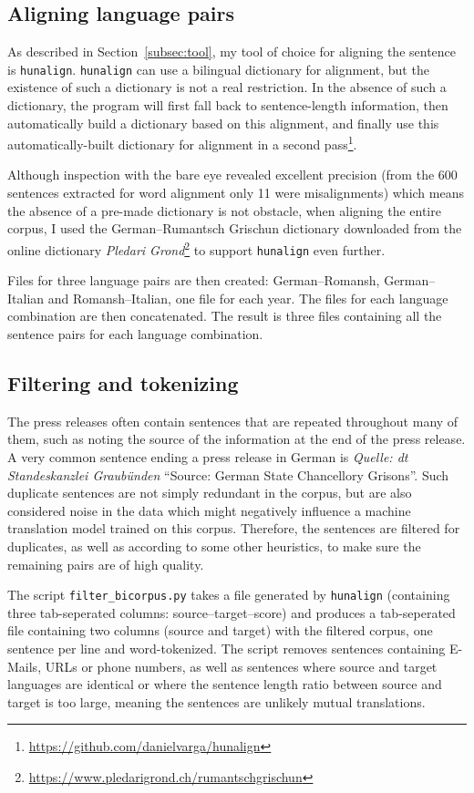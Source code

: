 \subsection{Aligning language pairs}
As described in Section~\ref{subsec:tool}, my tool of choice for aligning the sentence is \texttt{hunalign}. 
\texttt{hunalign} can use a bilingual dictionary for alignment, but the existence of such a dictionary is not a real restriction. 
In the absence of such a dictionary, the program will first fall back to sentence-length information, then automatically build a dictionary based on this alignment, and finally use this automatically-built dictionary for alignment in a second pass\footnote{\url{https://github.com/danielvarga/hunalign}}.

Although inspection with the bare eye revealed excellent precision (from the 600 sentences extracted for word alignment only 11 were misalignments) which means the absence of a pre-made dictionary is not obstacle, when aligning the entire corpus, I used the German--Rumantsch Grischun dictionary downloaded from the online dictionary \emph{Pledari Grond}\footnote{\url{https://www.pledarigrond.ch/rumantschgrischun}} to support \texttt{hunalign} even further.

Files for three language pairs are  then created: German--Romansh, German--Italian and Romansh--Italian, one file for each year. 
The files for each language combination are then concatenated.
The result is three files containing all the sentence pairs for each language combination.

\subsection{Filtering and tokenizing}
The press releases often contain sentences that are repeated throughout many of them, such as noting the source of the information at the end of the press release. 
A very common sentence ending a press release in German is \emph{Quelle: dt Standeskanzlei Graubünden} \enquote{Source: German State Chancellory Grisons}. 
Such duplicate sentences are not simply redundant in the corpus, but are also considered noise in the data which might negatively influence a machine translation model trained on this corpus. 
Therefore, the sentences are filtered for duplicates, as well as according to some other heuristics, to make sure the remaining pairs are of high quality.

The script \texttt{filter\_bicorpus.py} takes a file generated by \texttt{hunalign} (containing three tab-seperated columns: source--target--score) and produces a tab-seperated file containing two columns (source and target) with the filtered corpus, one sentence per line and word-tokenized. 
The script removes sentences containing E-Mails, URLs or phone numbers, as well as sentences where source and target languages are identical or where the sentence length ratio between source and target is too large, meaning the sentences are unlikely mutual translations.

